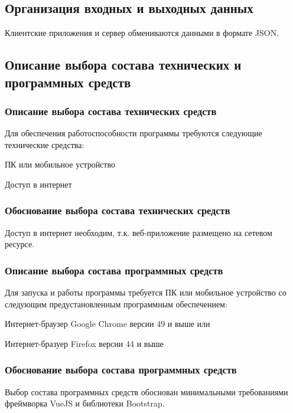 \subsection{Организация входных и выходных данных}
Клиентские приложения и сервер обмениваются данными в формате JSON.

\subsection{Описание выбора состава технических и программных средств}
\subsubsection{Описание выбора состава технических средств}
Для обеспечения работоспособности программы требуются следующие
технические средства:

\begin{my_enumerate}
  \item ПК или мобильное устройство
  \item Доступ в интернет
\end{my_enumerate}

\subsubsection{Обоснование выбора состава технических средств}
Доступ в интернет необходим, т.к. веб-приложение размещено на сетевом ресурсе.

\subsubsection{Описание выбора состава программных средств}
Для запуска и работы программы требуется ПК или мобильное устройство со
следующим предустановленным программным обеспечением:

\begin{my_enumerate}
  \item Интернет-браузер Google Chrome версии 49 и выше или
  \item Интернет-бразуер Firefox версии 44 и выше
\end{my_enumerate}

\subsubsection{Обоснование выбора состава программных средств}
Выбор состава программных средств обоснован минимальными требованиями
фреймворка VueJS и библиотеки Bootstrap. \cite{caniuse}

